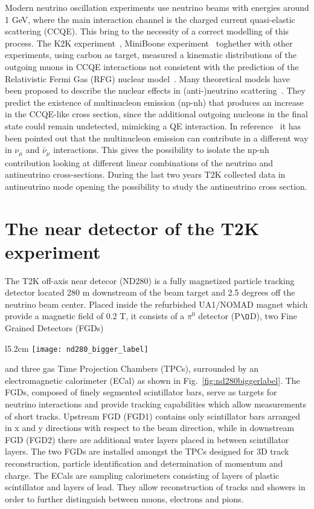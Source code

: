 \documentclass[12pt]{article}
\begin{document}
Modern neutrino oscillation experiments use neutrino beams with energies around 1 GeV, where the main interaction channel is the charged current quasi-elastic scattering (CCQE). This bring to the necessity of a correct modelling of this process. The K2K experiment~\cite{k2k}, MiniBoone experiment~\cite{mboone} toghether with other experiments, using carbon as target, measured a kinematic distributions of the outgoing muons in CCQE interactions not consistent with the prediction of the Relativistic Fermi Gas (RFG) nuclear model~\cite{rfg-smith72,rfg-smith75}. Many theoretical models have been proposed to describe the nuclear effects in (anti-)neutrino scattering~\cite{martini1,amaro,nieves2011}. They predict the existence of multinucleon emission (np-nh) that produces an increase in the CCQE-like cross section, since the additional outgoing nucleons in the final state could remain undetected, mimicking a QE interaction. In reference~\cite{martini2} it has been pointed out that the multinucleon emission can contribute in a different way in $\nu_\mu$ and $\bar{\nu}_\mu$ interactions. This gives the possibility to isolate the np-nh contribution looking at different linear combinations of the neutrino and antineutrino cross-sections. During the last two years T2K collected data in antineutrino mode opening the possibility to study the antineutrino cross section.

\section{The near detector of the T2K experiment}

The T2K off-axis near detecor (ND280) is a fully magnetized particle tracking detector located 280 m downstream of the beam target and 2.5 degrees off the neutrino beam center. Placed inside the refurbished UA1/NOMAD magnet which provide a magnetic field of 0.2 T, it consists of a $\pi^0$ detector (P$\O$D), two Fine Grained Detectors (FGDs)
\begin{wrapfigure}[11]{l}{5.2cm}
	\vspace{-2ex}%
	\texttt{[image: nd280\_bigger\_label]}
	\caption{View of ND280~\cite{t2knim}.}\label{fig:nd280biggerlabel}
\end{wrapfigure}
 and three gas Time Projection Chambers (TPCs), surrounded by an electromagnetic calorimeter (ECal) as shown in Fig.~\ref{fig:nd280biggerlabel}. The FGDs, composed of finely segmented scintillator bars, serve as targets for neutrino interactions and provide tracking capabilities which allow measurements of short tracks. Upstream FGD (FGD1) contains only scintillator bars arranged in x and y directions with respect to the beam direction, while in downstream FGD (FGD2) there are additional water layers placed in between scintillator layers. The two FGDs are installed amongst the TPCs designed for 3D track reconstruction, particle identification and determination of momentum and charge. The ECals are sampling calorimeters consisting of layers of plastic scintillator and layers of lead. They allow reconstruction of tracks and showers in order to further distinguish between muons, electrons and pions.
\end{document}
